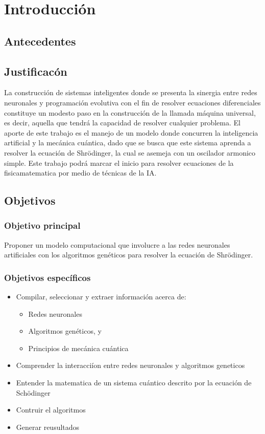 \chapter{Introducci\'on}
	\section{Antecedentes}

	\section{Justificac\'on}
	La construcci\'on de sistemas inteligentes donde se presenta la sinergia entre
	redes neuronales y programaci\'on evolutiva con el fin de resolver ecuaciones
	diferenciales constituye un modesto paso en la construcci\'on de la llamada 
	m\'aquina universal, es decir, aquella que tendr\'a  la capacidad de resolver 
	cualquier problema. El aporte de este trabajo es el manejo de un modelo donde
	concurren la inteligencia artificial y la mec\'anica cu\'antica, dado que se busca 
	que este sistema aprenda a resolver la ecuaci\'on de Shr\"odinger, la cual 
	se asemeja con un oscilador armonico simple. Este trabajo podr\'a  marcar el
	inicio para resolver ecuaciones de la fisicamatematica por medio de t\'ecnicas 
	de la IA.
	
	\section{Objetivos}
	\subsection{Objetivo principal}
	Proponer un modelo computacional que involucre a las redes neuronales artificiales
	con los algoritmos gen\'eticos para resolver la ecuaci\'on de Shr\"odinger.
	\subsection{Objetivos espec\'ificos}
	\begin{itemize}
		\item Compilar, seleccionar y extraer informaci\'on acerca de:
		\begin{itemize}
			\item Redes neuronales
			\item Algoritmos gen\'eticos, y
			\item Principios de mec\'anica cu\'antica
		\end{itemize}
		\item Comprender la interacci\'ion entre redes neuronales y algoritmos geneticos
		\item Entender la matematica de un sistema cu\'antico descrito por la ecuaci\'on de Sch\"odinger
		\item Contruir el algoritmos
		\item Generar reusultados
	\end{itemize}
